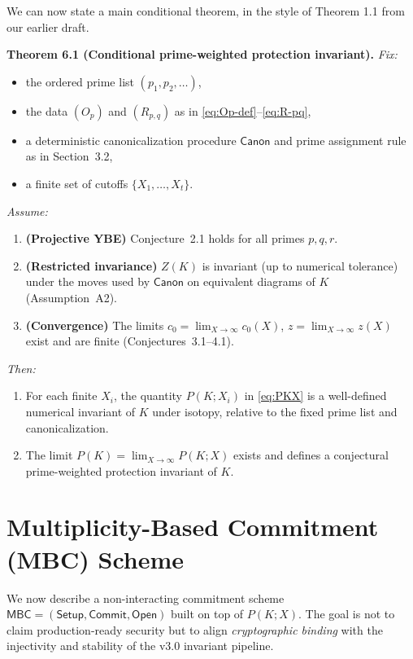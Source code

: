 \documentclass[11pt]{article}
\begin{document}
We can now state a main conditional theorem, in the style of Theorem 1.1 from our earlier draft.

\medskip

\noindent\textbf{Theorem 6.1 (Conditional prime-weighted protection invariant).}
\emph{Fix:}

\begin{itemize}
  \item the ordered prime list $(p_1,p_2,\dots)$,
  \item the data $(O_p)$ and $(R_{p,q})$ as in \eqref{eq:Op-def}--\eqref{eq:R-pq},
  \item a deterministic canonicalization procedure $\mathsf{Canon}$ and prime assignment rule as in Section~3.2,
  \item a finite set of cutoffs $\{X_1,\dots,X_t\}$.
\end{itemize}

\emph{Assume:}
\begin{enumerate}[(C1)]
  \item \textbf{(Projective YBE)} Conjecture~2.1 holds for all primes $p,q,r$.
  \item \textbf{(Restricted invariance)} $Z(K)$ is invariant (up to numerical tolerance) under the moves used by $\mathsf{Canon}$ on equivalent diagrams of $K$ (Assumption~A2).
  \item \textbf{(Convergence)} The limits $c_0 = \lim_{X\to\infty} c_0(X)$, $z = \lim_{X\to\infty} z(X)$ exist and are finite (Conjectures~3.1--4.1).
\end{enumerate}

\emph{Then:}
\begin{enumerate}[(1)]
  \item For each finite $X_i$, the quantity $P(K;X_i)$ in \eqref{eq:PKX} is a well-defined numerical invariant of $K$ under isotopy, relative to the fixed prime list and canonicalization.
  \item The limit $P(K) = \lim_{X\to\infty} P(K;X)$ exists and defines a conjectural prime-weighted protection invariant of $K$.
\end{enumerate}

\section{Multiplicity-Based Commitment (MBC) Scheme}

We now describe a non-interacting commitment scheme $\mathsf{MBC} = (\mathsf{Setup},\mathsf{Commit},\mathsf{Open})$ built on top of $P(K;X)$. The goal is not to claim production-ready security but to align \emph{cryptographic binding} with the injectivity and stability of the v3.0 invariant pipeline.
\end{document}
